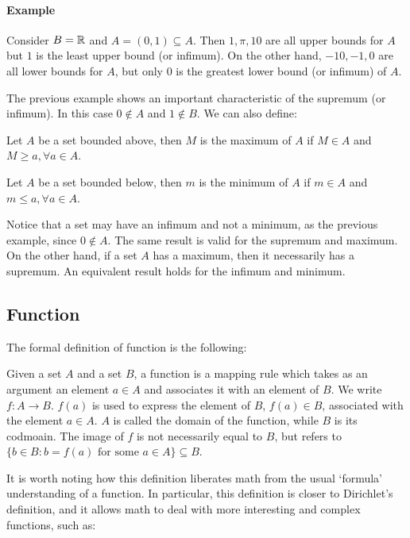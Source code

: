 \paragraph{Example}
Consider $B = \mathbb{R}$ and $A = (0,1) \subseteq A$. Then $1, \pi, 10$ are all upper bounds for $A$ but $1$ is the least upper bound (or infimum). On the other hand, $-10, -1, 0$ are all lower bounds for $A$, but only $0$ is the greatest lower bound (or infimum) of $A$.

The previous example shows an important characteristic of the supremum (or infimum). In this case $0 \notin A$ and $1 \notin B$. We can also define:

\begin{definition}[Maximum]
    Let $A$ be a set bounded above, then $M$ is the maximum of $A$ if $M \in A$ and $M \geq a, \forall a \in A$.
\end{definition}

\begin{definition}[Minimum]
    Let $A$ be a set bounded below, then $m$ is the minimum of $A$ if $m \in A$ and $m \leq a, \forall a \in A$.
\end{definition}

Notice that a set may have an infimum and not a minimum, as the previous example, since $0 \notin A$. The same result is valid for the supremum and maximum. On the other hand, if a set $A$ has a maximum, then it necessarily has a supremum. An equivalent result holds for the infimum and minimum.

\subsection{Function}

The formal definition of function is the following:

\begin{definition}[Function]
    Given a set $A$ and a set $B$, a function is a mapping rule which takes as an argument an element $a \in A$ and associates it with an element of $B$. We write $f: A \to B$. $f(a)$ is used to express the element of $B$, $f(a) \in B$, associated with the element $a \in A$. $A$ is called the domain of the function, while $B$ is its codmoain. The image of $f$ is not necessarily equal to $B$, but refers to $\{b \in B: b = f(a) \text{ for some } a \in A\} \subseteq B$.
\end{definition}

It is worth noting how this definition liberates math from the usual `formula' understanding of a function. In particular, this definition is closer to Dirichlet's definition, and it allows math to deal with more interesting and complex functions, such as:

